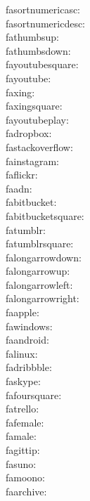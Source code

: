 fasortnumericasc: {\FA \fasortnumericasc} \\
fasortnumericdesc: {\FA \fasortnumericdesc} \\
fathumbsup: {\FA \fathumbsup} \\
fathumbsdown: {\FA \fathumbsdown} \\
fayoutubesquare: {\FA \fayoutubesquare} \\
fayoutube: {\FA \fayoutube} \\
faxing: {\FA \faxing} \\
faxingsquare: {\FA \faxingsquare} \\
fayoutubeplay: {\FA \fayoutubeplay} \\
fadropbox: {\FA \fadropbox} \\
fastackoverflow: {\FA \fastackoverflow} \\
fainstagram: {\FA \fainstagram} \\
faflickr: {\FA \faflickr} \\
faadn: {\FA \faadn} \\
fabitbucket: {\FA \fabitbucket} \\
fabitbucketsquare: {\FA \fabitbucketsquare} \\
fatumblr: {\FA \fatumblr} \\
fatumblrsquare: {\FA \fatumblrsquare} \\
falongarrowdown: {\FA \falongarrowdown} \\
falongarrowup: {\FA \falongarrowup} \\
falongarrowleft: {\FA \falongarrowleft} \\
falongarrowright: {\FA \falongarrowright} \\
faapple: {\FA \faapple} \\
fawindows: {\FA \fawindows} \\
faandroid: {\FA \faandroid} \\
falinux: {\FA \falinux} \\
fadribbble: {\FA \fadribbble} \\
faskype: {\FA \faskype} \\
fafoursquare: {\FA \fafoursquare} \\
fatrello: {\FA \fatrello} \\
fafemale: {\FA \fafemale} \\
famale: {\FA \famale} \\
fagittip: {\FA \fagittip} \\
fasuno: {\FA \fasuno} \\
famoono: {\FA \famoono} \\
faarchive: {\FA \faarchive} \\
